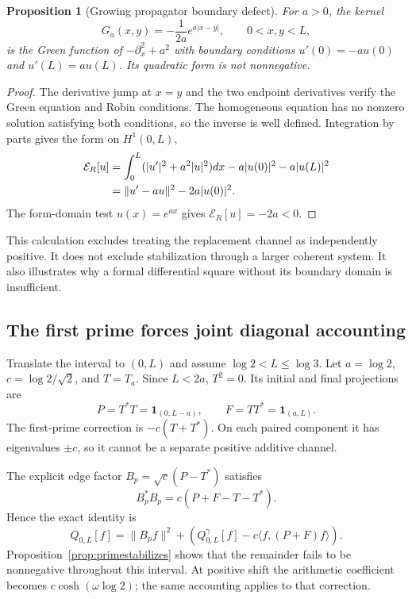 \documentclass[11pt]{article}
\numberwithin{equation}{section}
\newtheorem{proposition}[theorem]{Proposition}
\theoremstyle{definition}
\theoremstyle{remark}
\newcommand{\norm}[1]{\lVert#1\rVert}
\newcommand{\ip}[2]{\langle#1,#2\rangle}
\newcommand{\Qgam}{Q^{\gamma}}
\newcommand{\EE}{\mathcal E}
\begin{document}
\begin{proposition}[Growing propagator boundary defect]
For $a>0$, the kernel
\begin{equation}
G_a(x,y)=-\frac1{2a}e^{a|x-y|},\qquad 0<x,y<L,
\end{equation}
is the Green function of $-\partial_x^2+a^2$ with boundary conditions
$u'(0)=-au(0)$ and $u'(L)=au(L)$. Its quadratic form is not nonnegative.
\end{proposition}
\begin{proof}
The derivative jump at $x=y$ and the two endpoint derivatives verify
the Green equation and Robin conditions. The homogeneous equation has
no nonzero solution satisfying both conditions, so the inverse is
well defined. Integration by parts gives the form on $H^1(0,L)$,
\begin{align}
\EE_R[u]&=\int_0^L(|u'|^2+a^2|u|^2)dx
-a|u(0)|^2-a|u(L)|^2\notag\\
&=\norm{u'-au}^2-2a|u(0)|^2.
\end{align}
The form-domain test $u(x)=e^{ax}$ gives $\EE_R[u]=-2a<0$.
\end{proof}

This calculation excludes treating the replacement channel as independently
positive. It does not exclude stabilization through a larger coherent
system. It also illustrates why a formal differential square without its
boundary domain is insufficient.

\subsection{The first prime forces joint diagonal accounting}

Translate the interval to $(0,L)$ and assume $\log2<L\leq\log3$.
Let $a=\log2$, $c=\log2/\sqrt2$, and $T=T_a$. Since $L<2a$,
$T^2=0$. Its initial and final projections are
\begin{equation}
P=T^*T=\mathbf1_{(0,L-a)},\qquad
F=TT^*=\mathbf1_{(a,L)}.
\end{equation}
The first-prime correction is $-c(T+T^*)$. On each paired component it
has eigenvalues $\pm c$, so it cannot be a separate positive additive
channel.

The explicit edge factor $B_p=\sqrt c(P-T^*)$ satisfies
\begin{equation}
B_p^*B_p=c(P+F-T-T^*).
\end{equation}
Hence the exact identity is
\begin{equation}
Q_{0,L}[f]=\norm{B_pf}^2+
\left(\Qgam_{0,L}[f]-c\ip f{(P+F)f}\right).
\label{eq:primebudget}
\end{equation}
Proposition~\ref{prop:primestabilizes} shows that the remainder fails
to be nonnegative throughout this interval. At positive shift the
arithmetic coefficient becomes $c\cosh(\omega\log2)$; the same accounting
applies to that correction.
\end{document}
